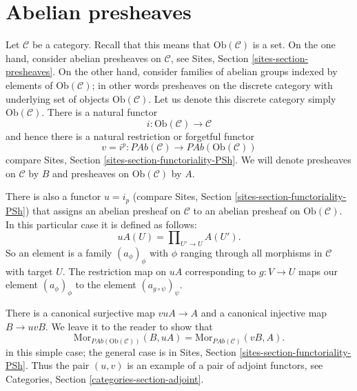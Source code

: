\section{Abelian presheaves}
\label{section-injectives-presheaves}

\noindent
Let $\mathcal{C}$ be a category. Recall that this means that
$\text{Ob}(\mathcal{C})$ is a set. On the one hand, consider abelian
presheaves on $\mathcal{C}$, see
Sites, Section \ref{sites-section-presheaves}.
On the other hand, consider families of abelian groups
indexed by elements of $\text{Ob}(\mathcal{C})$; in other
words presheaves on the discrete category with underlying set
of objects $\text{Ob}(\mathcal{C})$. Let us denote this
discrete category simply $\text{Ob}(\mathcal{C})$.
There is a natural functor
$$
i : \text{Ob}(\mathcal{C}) \longrightarrow \mathcal{C}
$$
and hence there is a natural restriction or forgetful functor
$$
v = i^p : 
\textit{PAb}(\mathcal{C})
\longrightarrow
\textit{PAb}(\text{Ob}(\mathcal{C}))
$$
compare Sites, Section \ref{sites-section-functoriality-PSh}.
We will denote presheaves
on $\mathcal{C}$ by $B$ and presheaves on
$\text{Ob}(\mathcal{C})$ by $A$.

\medskip\noindent
There is also a functor $u = i_p$ (compare
Sites, Section \ref{sites-section-functoriality-PSh})
that assigns an abelian presheaf on $\mathcal{C}$
to an abelian presheaf on $\text{Ob}(\mathcal{C})$.
In this particular case it is defined as follows:
$$
uA(U) = \prod\nolimits_{U' \to U} A(U').
$$
So an element is a family $(a_\phi)_\phi$ with $\phi$
ranging through all morphisms in $\mathcal{C}$ with target $U$.
The restriction map on $uA$ corresponding to $g : V \to U$
maps our element $(a_\phi)_\phi$ to the element 
$(a_{g \circ \psi})_\psi$. 

\medskip\noindent
There is a canonical surjective map $vuA \to A$ and a canonical
injective map $B \to uvB$. We leave it to the reader to show that
$$
\text{Mor}_{\textit{PAb}(\text{Ob}(\mathcal{C}))}(B, uA)
=
\text{Mor}_{\textit{PAb}(\mathcal{C})}(vB, A).
$$
in this simple case; the general case is in
Sites, Section \ref{sites-section-functoriality-PSh}.
Thus the pair $(u,v)$ is an example of a pair of adjoint
functors, see
Categories, Section \ref{categories-section-adjoint}.

